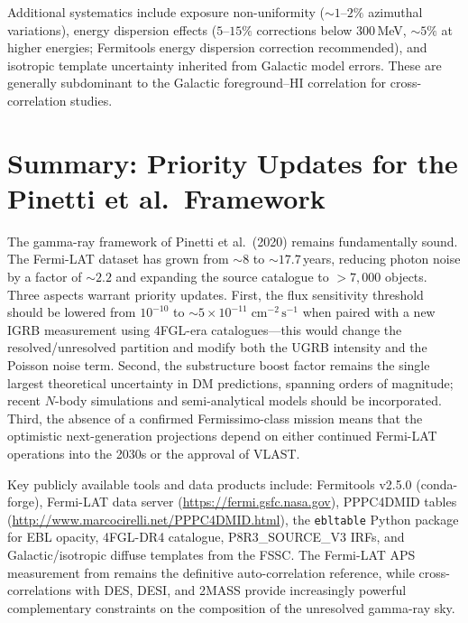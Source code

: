 \documentclass[10pt,a4paper]{article}
\begin{document}
Additional systematics include exposure non-uniformity ($\sim1$--$2\%$ azimuthal variations), energy dispersion effects ($5$--$15\%$ corrections below 300\,MeV, $\sim5\%$ at higher energies; Fermitools energy dispersion correction recommended), and isotropic template uncertainty inherited from Galactic model errors. These are generally subdominant to the Galactic foreground--HI correlation for cross-correlation studies.


\section{Summary: Priority Updates for the Pinetti et al.\ Framework}
\label{sec:conclusions}

The gamma-ray framework of Pinetti et al.\ (2020) remains fundamentally sound. The Fermi-LAT dataset has grown from $\sim8$ to $\sim17.7$\,years, reducing photon noise by a factor of $\sim2.2$ and expanding the source catalogue to $>7{,}000$ objects. Three aspects warrant priority updates. First, the flux sensitivity threshold should be lowered from $10^{-10}$ to $\sim5 \times 10^{-11}\;\mathrm{cm^{-2}\,s^{-1}}$ when paired with a new IGRB measurement using 4FGL-era catalogues---this would change the resolved/unresolved partition and modify both the UGRB intensity and the Poisson noise term. Second, the substructure boost factor remains the single largest theoretical uncertainty in DM predictions, spanning orders of magnitude; recent $N$-body simulations and semi-analytical models should be incorporated. Third, the absence of a confirmed Fermissimo-class mission means that the optimistic next-generation projections depend on either continued Fermi-LAT operations into the 2030s or the approval of VLAST.

Key publicly available tools and data products include: Fermitools v2.5.0 (conda-forge), Fermi-LAT data server (\url{https://fermi.gsfc.nasa.gov}), PPPC4DMID tables (\url{http://www.marcocirelli.net/PPPC4DMID.html}), the \texttt{ebltable} Python package for EBL opacity, 4FGL-DR4 catalogue, P8R3\_SOURCE\_V3 IRFs, and Galactic/isotropic diffuse templates from the FSSC. The Fermi-LAT APS measurement from \citet{Ackermann2018APS} remains the definitive auto-correlation reference, while cross-correlations with DES, DESI, and 2MASS provide increasingly powerful complementary constraints on the composition of the unresolved gamma-ray sky.
\end{document}
